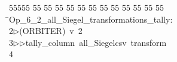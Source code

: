 %
%
\begin{tabbing}
55555 \= 55 \= 55 \= 55 \= 55 \= 55 \= 55 \= 55 \= 55 \= 55 \= 55 \= 55 \= 55 \= \>Op\_6\_2\_all\_Siegel\_transformations\_tally:\\[0pt]
2\>$\triangleright$\>(ORBITER)\ v\ 2\ \\[0pt]
3\>$\triangleright$\>$\triangleright$\>tally\_column\ all\_Siegelcsv\ transform\\[0pt]
4\>\end{tabbing}
